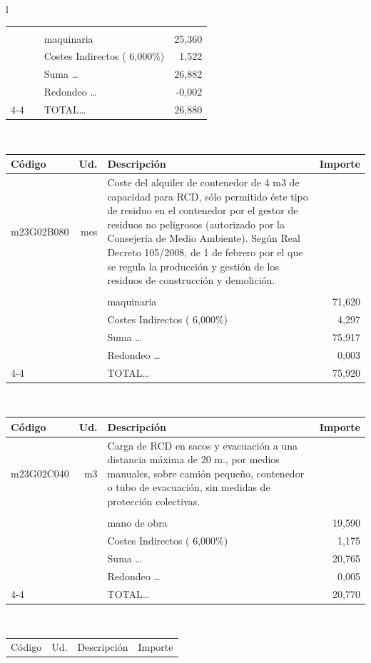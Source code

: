 \documentclass{book}%
\begin{document}
\begin{longtable}{l}
\begin{tabular}{l r p{60mm} r}
&&&\\%
&&maquinaria&    25,360\\%
&&Costes Indirectos (     6,000\%)&     1,522\\%
&&Suma \ldots&    26,882\\%
&&Redondeo \ldots&    {-}0,002\\%
\cline{4-4}%
&&TOTAL\ldots&    26,880\\%
\end{tabular}\\%
\begin{tabular}{l r p{60mm} r}%
Código&Ud.&Descripción&Importe\\%
\hline%
m23G02B080&mes&Coste del alquiler de contenedor de 4 m3 de capacidad para RCD, sólo permitido éste tipo de residuo en el contenedor por el gestor de residuos no peligrosos (autorizado por la Consejería de Medio Ambiente). Según Real Decreto 105/2008, de 1 de febrero por el que se regula la producción y gestión de los residuos de construcción y demolición.&\\%
&&&\\%
&&maquinaria&    71,620\\%
&&Costes Indirectos (     6,000\%)&     4,297\\%
&&Suma \ldots&    75,917\\%
&&Redondeo \ldots&     0,003\\%
\cline{4-4}%
&&TOTAL\ldots&    75,920\\%
\end{tabular}\\%
\begin{tabular}{l r p{60mm} r}%
Código&Ud.&Descripción&Importe\\%
\hline%
m23G02C040&m3&Carga de RCD en sacos y evacuación a una distancia máxima de 20 m., por medios manuales, sobre camión pequeño, contenedor o tubo de evacuación, sin medidas de protección colectivas.&\\%
&&&\\%
&&mano de obra&    19,590\\%
&&Costes Indirectos (     6,000\%)&     1,175\\%
&&Suma \ldots&    20,765\\%
&&Redondeo \ldots&     0,005\\%
\cline{4-4}%
&&TOTAL\ldots&    20,770\\%
\end{tabular}\\%
\begin{tabular}{l r p{60mm} r}%
Código&Ud.&Descripción&Importe\\%

\end{tabular}
\end{longtable}
\end{document}
